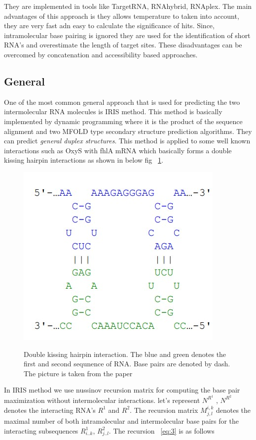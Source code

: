 \documentclass[twoside,a4paper]{report}
\begin{document}
	They are implemented in tools like TargetRNA, RNAhybrid, RNAplex. The main advantages of this approach is they allows temperature to taken into account, they are very fast adn easy to calculate the significance of hits.  Since,  intramolecular base pairing is ignored they are used for the identification of short RNA's and overestimate the length of target sites. These disadvantages can be overcomed by concatenation and accessibility based approaches.\\ 
	
	\subsection{General}
	One of the most common general approach that is used for predicting the two intermolecular RNA molecules is IRIS \citep{pervouchine2004iris} method. This method is basically implemented by dynamic programming where it is the product of the sequence alignment and two MFOLD type secondary structure prediction algorithms. They can predict \textit{general duplex structures}. This method is applied to some well known interactions such as OxyS with fhlA mRNA which basically forms a double kissing hairpin interactions as shown in below fig ~\ref{fig:doublekiss}.\\
	
	 \begin{figure}[H]
		\includegraphics[width=0.4\linewidth]{doublekiss}
		\centering
		\caption{ Double kissing hairpin interaction. The blue and green denotes the first and second sequnence of RNA. Base pairs are denoted by dash. The picture is taken from the paper } 
		\citep{wright2018structure}
		\label{fig:doublekiss}
	\end{figure}
	
	In IRIS method we use nussinov recursion matrix for computing the base pair maximization without intermolecular interactions. let's represent $N^{R^1}$ , $N^{R^2}$ denotes the interacting RNA's $R^1$ and $R^2$. The recursion matrix $M^{i, k}_{j, l}$ denotes the maximal number of both intramolecular and intermolecular base pairs for the interacting subsequences $ R^1_{i..k}$, $R^2_{j..l}$. The recursion ~\ref{eq:3} is as follows    \\ 
	
\end{document}

